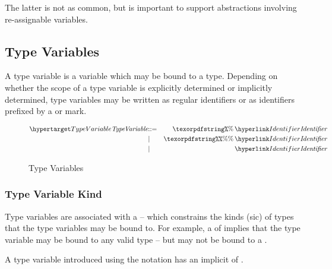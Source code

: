 \begin{aside}
The latter is not as common, but is important to support abstractions involving re-assignable variables.
\end{aside}

\subsection{Type Variables}
\label{typeVariable}

A type variable is a variable which may be bound to a type. Depending on whether the scope of a type variable is explicitly determined or implicitly determined, type variables may be written as regular identifiers or as identifiers prefixed by a \q{\pcent{}} or \q{\pcent{}\pcent{}} mark.

\begin{figure}[htbp]
\begin{eqnarray*}
\ntDef{TypeVariable}&\arrow&\q{\pcent{}}\,\ntRef{Identifier}\\
&\choice&\q{\pcent{}\pcent{}}\,\ntRef{Identifier}\\
&\choice&\ntRef{Identifier}
\end{eqnarray*}
\caption{Type Variables}
\label{typeVariableFig}
\end{figure}

\subsubsection{Type Variable Kind}
Type variables are associated with a  -- which constrains the kinds (sic) of types that the type variables may be bound to. For example, a  of  implies that the type variable may be bound to any valid type -- but may not be bound to a .

A type variable introduced using the \q{\pcent{}} notation has an implicit  of .

